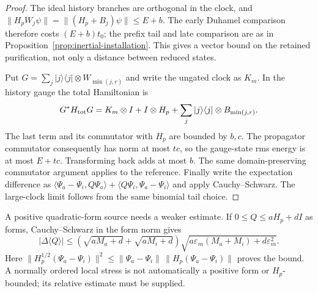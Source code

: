 \begin{proof}
The ideal history branches are orthogonal in the clock, and
$\|H_pW_j\psi\|=\|(H_p+B_j)\psi\|\le E+b$. The early Duhamel
comparison therefore costs $(E+b)t_0$; the prefix tail and late
comparison are as in Proposition~\ref{prop:inertial-installation}.
This gives a vector bound on the retained purification, not only a
distance between reduced states.

Put $G=\sum_j|j\rangle\langle j|\otimes W_{\min(j,r)}$ and write the
ungated clock as $K_m$. In the history gauge the total Hamiltonian is
\[
 G^*H_{\rm tot}G=K_m\otimes I+I\otimes H_p+
          \sum_j|j\rangle\langle j|\otimes B_{\min(j,r)}.
\]
The last term and its commutator with $H_p$ are bounded by $b,c$.
The propagator commutator consequently has norm at most $tc$, so
the gauge-state rms energy is at most $E+tc$. Transforming back adds
at most $b$. The same domain-preserving commutator argument applies
to the reference. Finally write the expectation difference as
$\langle\Psi_a-\Psi_i,Q\Psi_a\rangle+
\langle Q\Psi_i,\Psi_a-\Psi_i\rangle$ and apply Cauchy--Schwarz.
The large-clock limit follows from the same binomial tail choice.
\end{proof}

A positive quadratic-form source needs a weaker estimate. If
$0\le Q\le aH_p+dI$ as forms, Cauchy--Schwarz in the form norm gives
\begin{equation}\label{eq:energy-regular-form}
 |\Delta\langle Q\rangle|\le
 (\sqrt{aM_a+d}+\sqrt{aM_i+d})
 \sqrt{a\varepsilon_m(M_a+M_i)+d\varepsilon_m^2}.
\end{equation}
Here $\|H_p^{1/2}(\Psi_a-\Psi_i)\|^2
\le\|\Psi_a-\Psi_i\|\,\|H_p(\Psi_a-\Psi_i)\|$ proves the bound.
A normally ordered local stress is not automatically a positive form
or $H_p$-bounded; its relative estimate must be supplied.

